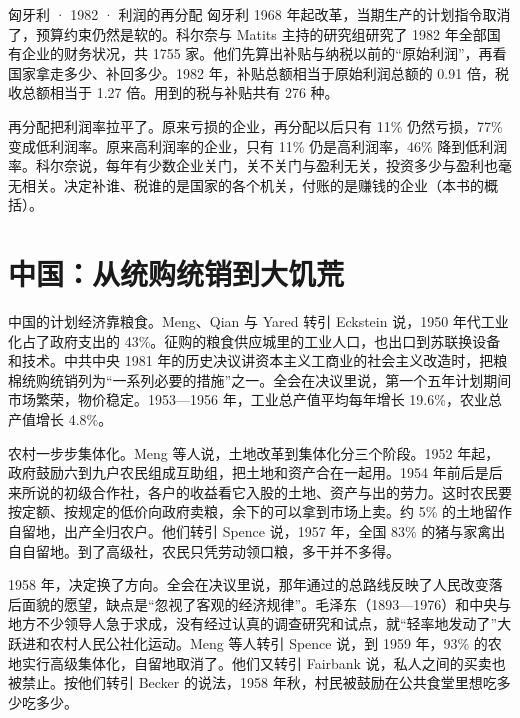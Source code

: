 \begin{case}{匈牙利 · 1982 · 利润的再分配}
匈牙利 1968 年起改革，当期生产的计划指令取消了，预算约束仍然是软的\cite{kornai1980,kornai1986}。科尔奈与 Matits 主持的研究组研究了 1982 年全部国有企业的财务状况，共 1755 家\cite{kornai1986}。他们先算出补贴与纳税以前的“原始利润”，再看国家拿走多少、补回多少\cite{kornai1986}。1982 年，补贴总额相当于原始利润总额的 0.91 倍，税收总额相当于 1.27 倍\cite{kornai1986}。用到的税与补贴共有 276 种\cite{kornai1986}。

再分配把利润率拉平了。原来亏损的企业，再分配以后只有 11\% 仍然亏损，77\% 变成低利润率\cite{kornai1986}。原来高利润率的企业，只有 11\% 仍是高利润率，46\% 降到低利润率\cite{kornai1986}。科尔奈说，每年有少数企业关门，关不关门与盈利无关，投资多少与盈利也毫无相关\cite{kornai1986}。决定补谁、税谁的是国家的各个机关，付账的是赚钱的企业（本书的概括）。
\end{case}

\section{中国：从统购统销到大饥荒}\label{sec:planned-china}

中国的计划经济靠粮食。Meng、Qian 与 Yared 转引 Eckstein 说，1950 年代工业化占了政府支出的 43\%\cite{mqy2010}。征购的粮食供应城里的工业人口，也出口到苏联换设备和技术\cite{mqy2010}。中共中央 1981 年的历史决议讲资本主义工商业的社会主义改造时，把粮棉统购统销列为“一系列必要的措施”之一\cite{res1981}。全会在决议里说，第一个五年计划期间市场繁荣，物价稳定\cite{res1981}。1953—1956 年，工业总产值平均每年增长 19.6\%，农业总产值增长 4.8\%\cite{res1981}。

农村一步步集体化。Meng 等人说，土地改革到集体化分三个阶段\cite{mqy2010}。1952 年起，政府鼓励六到九户农民组成互助组，把土地和资产合在一起用\cite{mqy2010}。1954 年前后是后来所说的初级合作社，各户的收益看它入股的土地、资产与出的劳力\cite{mqy2010}。这时农民要按定额、按规定的低价向政府卖粮，余下的可以拿到市场上卖\cite{mqy2010}。约 5\% 的土地留作自留地，出产全归农户\cite{mqy2010}。他们转引 Spence 说，1957 年，全国 83\% 的猪与家禽出自自留地\cite{mqy2010}。到了高级社，农民只凭劳动领口粮，多干并不多得\cite{mqy2010}。

1958 年，决定换了方向。全会在决议里说，那年通过的总路线反映了人民改变落后面貌的愿望，缺点是“忽视了客观的经济规律”\cite{res1981}。毛泽东（1893—1976）和中央与地方不少领导人急于求成，没有经过认真的调查研究和试点，就“轻率地发动了”大跃进和农村人民公社化运动\cite{res1981,loc43}。Meng 等人转引 Spence 说，到 1959 年，93\% 的农地实行高级集体化，自留地取消了\cite{mqy2010}。他们又转引 Fairbank 说，私人之间的买卖也被禁止\cite{mqy2010}。按他们转引 Becker 的说法，1958 年秋，村民被鼓励在公共食堂里想吃多少吃多少\cite{mqy2010}。

